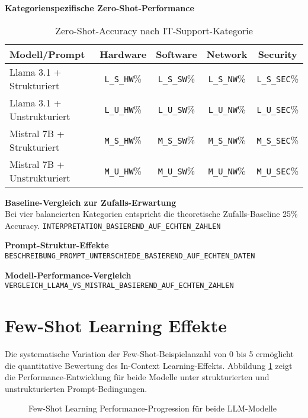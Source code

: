 \textbf{Kategorienspezifische Zero-Shot-Performance}\\
\begin{table}[h!]
\centering
\caption{Zero-Shot-Accuracy nach IT-Support-Kategorie}
\label{tab:category-performance}
\small
\begin{tabular}{@{}lcccc@{}}
\toprule
\textbf{Modell/Prompt} & \textbf{Hardware} & \textbf{Software} & \textbf{Network} & \textbf{Security} \\
\midrule
Llama 3.1 + Strukturiert & \texttt{L\_S\_HW}\% & \texttt{L\_S\_SW}\% & \texttt{L\_S\_NW}\% & \texttt{L\_S\_SEC}\% \\
Llama 3.1 + Unstrukturiert & \texttt{L\_U\_HW}\% & \texttt{L\_U\_SW}\% & \texttt{L\_U\_NW}\% & \texttt{L\_U\_SEC}\% \\
Mistral 7B + Strukturiert & \texttt{M\_S\_HW}\% & \texttt{M\_S\_SW}\% & \texttt{M\_S\_NW}\% & \texttt{M\_S\_SEC}\% \\
Mistral 7B + Unstrukturiert & \texttt{M\_U\_HW}\% & \texttt{M\_U\_SW}\% & \texttt{M\_U\_NW}\% & \texttt{M\_U\_SEC}\% \\
\bottomrule
\end{tabular}
\end{table}

\textbf{Baseline-Vergleich zur Zufalls-Erwartung}\\
Bei vier balancierten Kategorien entspricht die theoretische Zufalls-Baseline 25\% Accuracy. \texttt{INTERPRETATION\_BASIEREND\_AUF\_ECHTEN\_ZAHLEN}

\textbf{Prompt-Struktur-Effekte}\\
\texttt{BESCHREIBUNG\_PROMPT\_UNTERSCHIEDE\_BASIEREND\_AUF\_ECHTEN\_DATEN}

\textbf{Modell-Performance-Vergleich}\\
\texttt{VERGLEICH\_LLAMA\_VS\_MISTRAL\_BASIEREND\_AUF\_ECHTEN\_ZAHLEN}

\section{Few-Shot Learning Effekte}
Die systematische Variation der Few-Shot-Beispielanzahl von 0 bis 5 ermöglicht die quantitative Bewertung des In-Context Learning-Effekts. Abbildung \ref{fig:few-shot-progression} zeigt die Performance-Entwicklung für beide Modelle unter strukturierten und unstrukturierten Prompt-Bedingungen.

\begin{figure}[h!]
\centering

\caption{Few-Shot Learning Performance-Progression für beide LLM-Modelle}
\label{fig:few-shot-progression}
\end{figure}

